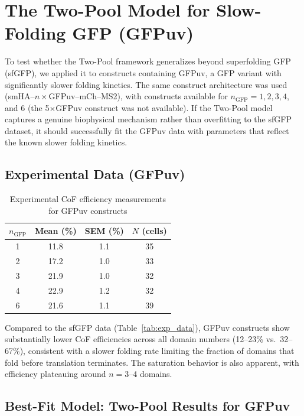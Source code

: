 \documentclass[11pt,a4paper]{article}
\begin{document}
\section{The Two-Pool Model for Slow-Folding GFP (GFPuv)}
\label{sec:twopool_slow}

To test whether the Two-Pool framework generalizes beyond superfolding GFP (sfGFP), we applied it to constructs containing GFPuv, a GFP variant with significantly slower folding kinetics. The same construct architecture was used (smHA--$n\times$GFPuv--mCh--MS2), with constructs available for $n_{\text{GFP}} = 1, 2, 3, 4$, and $6$ (the 5$\times$GFPuv construct was not available). If the Two-Pool model captures a genuine biophysical mechanism rather than overfitting to the sfGFP dataset, it should successfully fit the GFPuv data with parameters that reflect the known slower folding kinetics.

\subsection{Experimental Data (GFPuv)}

\begin{table}[H]
\centering
\caption{Experimental CoF efficiency measurements for GFPuv constructs}
\label{tab:exp_data_slow}
\begin{tabular}{@{}cccc@{}}
\toprule
\textbf{$n_{\text{GFP}}$} & \textbf{Mean (\%)} & \textbf{SEM (\%)} & \textbf{$N$ (cells)} \\
\midrule
1 & 11.8 & 1.1 & 35 \\
2 & 17.2 & 1.0 & 33 \\
3 & 21.9 & 1.0 & 32 \\
4 & 22.9 & 1.2 & 32 \\
6 & 21.6 & 1.1 & 39 \\
\bottomrule
\end{tabular}
\end{table}

Compared to the sfGFP data (Table~\ref{tab:exp_data}), GFPuv constructs show substantially lower CoF efficiencies across all domain numbers (12--23\% vs.\ 32--67\%), consistent with a slower folding rate limiting the fraction of domains that fold before translation terminates. The saturation behavior is also apparent, with efficiency plateauing around $n = 3$--4 domains.

\subsection{Best-Fit Model: Two-Pool Results for GFPuv}
\end{document}
